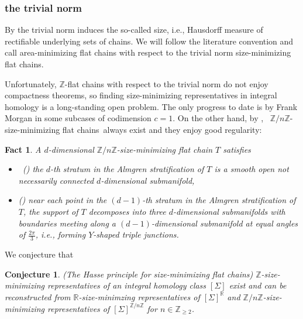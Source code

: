 \documentclass[11pt,a4paper]{amsart}
\numberwithin{equation}{section}
\newcommand{\Si}{\Sigma}
\newcommand{\R}{\mathbb{R}}
\newcommand{\Z}{\mathbb{Z}}
\theoremstyle{plain}
\newtheorem{fact}{Fact}[subsection]
\newtheorem{conj}{Conjecture}
\theoremstyle{definition}
\numberwithin{equation}{subsection}
\begin{document}
\subsubsection{the trivial norm}
By \cite{BWrc,BWdt} the trivial norm induces the so-called size, i.e., Hausdorff measure of rectifiable underlying sets of chains. We will follow the literature convention and call area-minimizing flat chains with respect to the trivial norm size-minimizing flat chains. 

Unfortunately, $\Z$-flat chains with respect to the trivial norm do not enjoy compactness theorems, so finding size-minimizing representatives in integral homology is a long-standing open problem. The only progress to date is by Frank Morgan \cite{FMsm} in some subcases of codimension $c=1$. On the other hand, by \cite{BWrc,BWdt},  $\Z/n\Z$-size-minimizing flat chains always exist and they enjoy good regularity:
\begin{fact}
	A $d$-dimensional $\Z/n\Z$-size-minimizing flat chain $T$ satisfies
	\begin{itemize}
		\item  (\cite{BWfrfc}) the $d$-th stratum in the Almgren stratification of $T$ is a smooth open not necessarily connected $d$-dimensional submanifold,
		\item (\cite{FMmcr,LScy}) near each point in the $(d-1)$-th stratum in the Almgren stratification of $T$, the support of $T$ decomposes into three $d$-dimensional submanifolds with boundaries meeting along a $(d-1)$-dimensional submanifold at equal angles of $\frac{2\pi}{3}$, i.e., forming $Y$-shaped triple junctions.
	\end{itemize} 
\end{fact}
We conjecture that
\begin{conj}
	(The Hasse principle for size-minimizing flat chains) $\Z$-size-minimizing representatives of an integral homology class $[\Si]$ exist and can be reconstructed from $\R$-size-minimzing representatives of $[\Si]^{\R}$ and $\Z/n\Z$-size-minimizing representatives of $[\Si]^{\Z/n\Z}$ for $n\in\Z_{\ge 2}$.
\end{conj}

	\printbibliography
	
\end{document}
